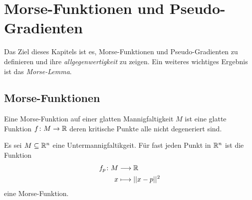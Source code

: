 \chapter{Morse-Funktionen und Pseudo-Gradienten}

Das Ziel dieses Kapitels ist es, Morse-Funktionen und Pseudo-Gradienten zu
definieren und ihre 
\textit{allgegenwertigkeit} zu zeigen. Ein weiteres wichtiges Ergebnis ist
das \textit{Morse-Lemma}.

\section{Morse-Funktionen}

\begin{definition}
    \label{def: morse-funktion}
    Eine Morse-Funktion auf einer glatten Mannigfaltigkeit $M$ ist eine glatte Funktion
    $f \colon M \to { \mathbb R }$ deren kritische Punkte alle nicht degeneriert sind.
\end{definition}

\begin{prop}
    Es sei $M \subseteq { \mathbb R }^n$ eine Untermannigfaltikgeit. Für fast jeden Punkt in ${ \mathbb R }^n$ ist
    die Funktion
    \begin{align*}
        f_p \colon M & \longrightarrow { \mathbb R } \\
        x & \longmapsto || x - p ||^2
    \end{align*}
    eine Morse-Funktion.
\end{prop}

